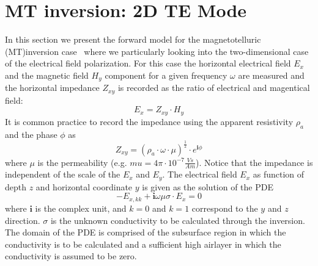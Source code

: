 %
%
%


\section{MT inversion: 2D TE Mode}\label{sec:forward 2DMT TEMode}
In this section we present the forward model for the magnetotelluric (MT)inversion case~\cite{chave2012magnetotelluric} 
where we particularly looking into the two-dimensional case of the electrical field polarization.
For this case the horizontal electrical field $E_x$ and the magnetic field $H_y$ component 
for a given frequency $\omega$ are measured and the horizontal impedance $Z_{xy}$  is recorded as the ratio of
electrical and magentical field: 
\begin{equation}\label{ref:2DMTTE:EQU:1}
E_x  = Z_{xy} \cdot H_y 
\end{equation}
It is common practice to record the impedance using the apparent resistivity $\rho_a$ and the 
phase $\phi$ as 
\begin{equation}\label{ref:2DMTTE:EQU:2}
Z_{xy} = (\rho_a \cdot \omega \cdot \mu) ^{\frac{1}{2}} \cdot e^{\mathbf{i} \phi}
\end{equation}
where $\mu$ is the permeability (e.g. $mu = 4 \pi \cdot 10^{-7} \frac{Vs}{Am}$). Notice that the impedance is independent of the scale of the $E_x$ and $E_y$.
The electrical field $E_x$ as function of depth $z$ and horizontal coordinate $y$ is given as the solution of the 
PDE
\begin{equation}\label{ref:2DMTTE:EQU:3}
- E_{x,kk}  + \mathbf{i} \omega \mu \sigma \cdot E_x = 0 
\end{equation}
where $\mathbf{i}$ is the complex unit, and $k=0$ and $k=1$ correspond to the $y$ and $z$ direction.
$\sigma$ is the unknown conductivity to be calculated through the inversion. The domain 
of the PDE is comprised of the subsurface region in which the conductivity is to be calculated 
and a sufficient high airlayer in which the conductivity is assumed to be zero.



